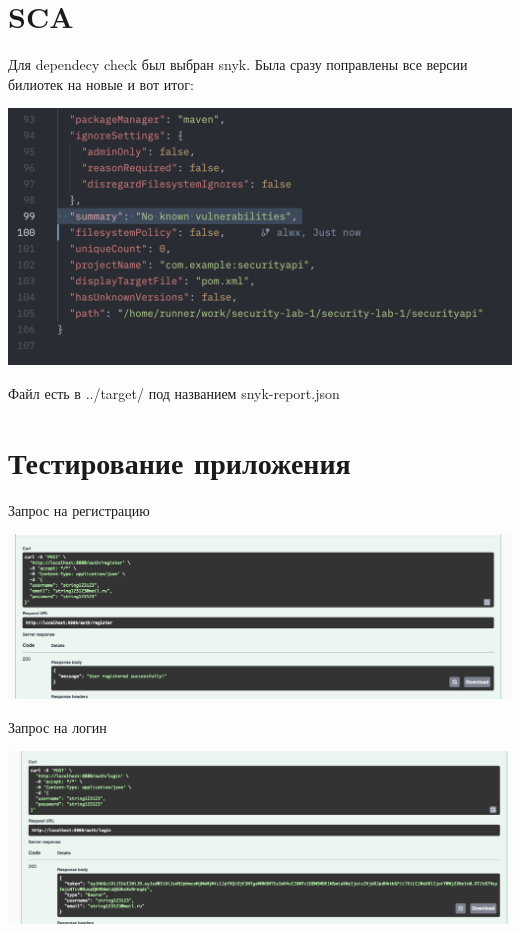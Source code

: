 \documentclass{article}
\begin{document}
\section*{SCA}
Для dependecy check был выбран snyk. Была сразу поправлены все версии билиотек на новые и вот итог:
\begin{center}
  \includegraphics[width=.9\textwidth]{snyk.png}
\end{center}

Файл есть в ../target/ под названием snyk-report.json

\section*{Тестирование приложения}

Запрос на регистрацию
\begin{center}
    \includegraphics[width=.9\textwidth]{reg.png}
\end{center}

Запрос на логин
\begin{center}
    \includegraphics[width=.9\textwidth]{login}
\end{center}
\end{document}
